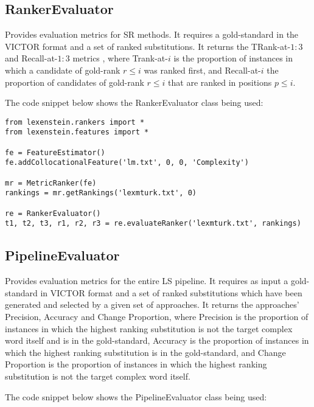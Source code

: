 \subsection{RankerEvaluator}

Provides evaluation metrics for SR methods. It requires a gold-standard in the VICTOR format and a set of ranked substitutions. It returns the TRank-at-$1:3$ and Recall-at-$1:3$ metrics \cite{semeval}, where Trank-at-$i$ is the proportion of instances in which a candidate of gold-rank $r\leq i$ was ranked first, and Recall-at-$i$ the proportion of candidates of gold-rank $r\leq i$ that are ranked in positions $p\leq i$.

The code snippet below shows the RankerEvaluator class being used:

\begin{lstlisting}
from lexenstein.rankers import *
from lexenstein.features import *

fe = FeatureEstimator()
fe.addCollocationalFeature('lm.txt', 0, 0, 'Complexity')

mr = MetricRanker(fe)
rankings = mr.getRankings('lexmturk.txt', 0)

re = RankerEvaluator()
t1, t2, t3, r1, r2, r3 = re.evaluateRanker('lexmturk.txt', rankings)
\end{lstlisting}












\subsection{PipelineEvaluator}

Provides evaluation metrics for the entire LS pipeline. It requires as input a gold-standard in VICTOR format and a set of ranked substitutions which have been generated and selected by a given set of approaches. It returns the approaches' Precision, Accuracy and Change Proportion, where Precision is the proportion of instances in which the highest ranking substitution is not the target complex word itself and is in the gold-standard, Accuracy is the proportion of instances in which the highest ranking substitution is in the gold-standard, and Change Proportion is the proportion of instances in which the highest ranking substitution is not the target complex word itself.

The code snippet below shows the PipelineEvaluator class being used:

